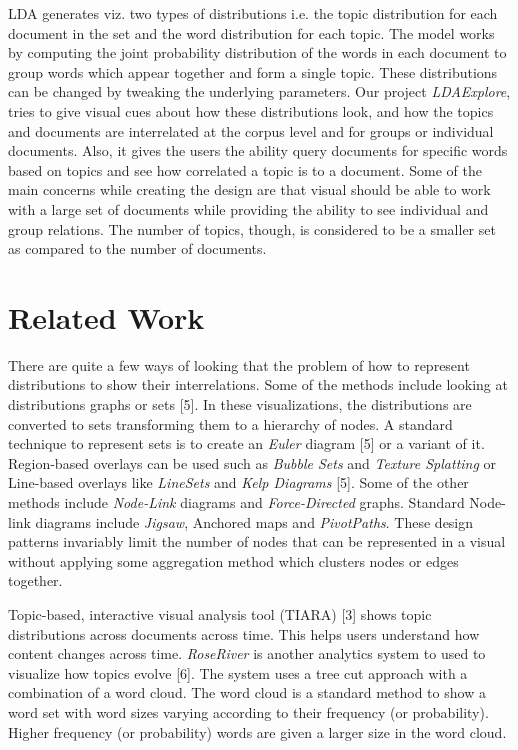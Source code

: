 \documentclass[10pt,journal,compsoc]{IEEEtran}
\begin{document}
LDA generates viz. two types of distributions i.e. the topic distribution for each document in the set and the word distribution for each topic. The model works by computing the joint probability distribution of the words in each document to group words which appear together and form a single topic. These distributions can be changed by tweaking the underlying parameters. Our project \textit{LDAExplore}, tries to give visual cues about how these distributions look, and how the topics and documents are interrelated at the corpus level and for groups or individual documents. Also, it gives the users the ability query documents for specific words based on topics and see how correlated a topic is to a document. Some of the main concerns while creating the design are that visual should be able to work with a large set of documents while providing the ability to see individual and group relations. The number of topics, though, is considered to be a smaller set as compared to the number of documents.

\section{Related Work}
\label{sec:RelatedWork}
There are quite a few ways of looking that the problem of how to represent distributions to show their interrelations. Some of the methods include looking at distributions graphs or sets [5]. In these visualizations, the distributions are converted to sets transforming them to a hierarchy of nodes. A standard technique to represent sets is to create an \textit{Euler} diagram [5] or a variant of it. Region-based overlays can be used such as \textit{Bubble Sets} and \textit{Texture Splatting} or Line-based overlays like \textit{LineSets} and \textit{Kelp Diagrams} [5]. Some of the other methods include \textit{Node-Link} diagrams and \textit{Force-Directed} graphs. Standard Node-link diagrams include \textit{Jigsaw}, Anchored maps and \textit{PivotPaths}. These design patterns invariably limit the number of nodes that can be represented in a visual without applying some aggregation method which clusters nodes or edges together.

Topic-based, interactive visual analysis tool (TIARA) [3] shows topic distributions across documents across time. This helps users understand how content changes across time. \textit{RoseRiver} is another analytics system to used to visualize how topics evolve [6]. The system uses a tree cut approach with a combination of a word cloud. The word cloud is a standard method to show a word set with word sizes varying according to their frequency (or probability). Higher frequency (or probability) words are given a larger size in the word cloud.
\end{document}
